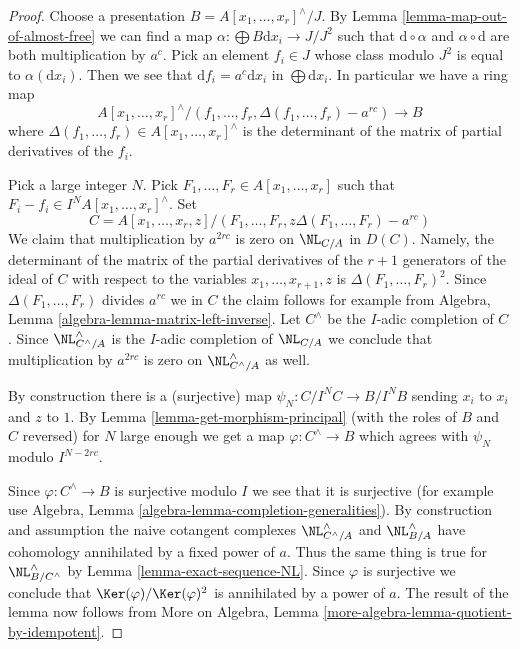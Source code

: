 \begin{proof}
Choose a presentation $B = A[x_1, \ldots, x_r]^\wedge/J$.
By Lemma \ref{lemma-map-out-of-almost-free} we can find a map
$\alpha : \bigoplus B\text{d}x_i \to J/J^2$ such that
$\text{d} \circ \alpha$ and $\alpha \circ \text{d}$ are both
multiplication by $a^c$. Pick an element $f_i \in J$ whose
class modulo $J^2$ is equal to $\alpha(\text{d}x_i)$.
Then we see that $\text{d}f_i = a^c \text{d}x_i$ in $\bigoplus \text{d}x_i$.
In particular we have a ring map
$$
A[x_1, \ldots, x_r]^\wedge/
(f_1, \ldots, f_r, \Delta(f_1, \ldots, f_r) - a^{rc})
\longrightarrow B
$$
where $\Delta(f_1, \ldots, f_r) \in A[x_1, \ldots, x_r]^\wedge$
is the determinant of the matrix of partial derivatives of the $f_i$.

\medskip\noindent
Pick a large integer $N$. Pick $F_1, \ldots, F_r \in A[x_1, \ldots, x_r]$
such that $F_i - f_i \in I^NA[x_1, \ldots, x_r]^\wedge$. Set
$$
C = A[x_1, \ldots, x_r, z]/
(F_1, \ldots, F_r, z\Delta(F_1, \ldots, F_r) - a^{rc})
$$
We claim that multiplication by $a^{2rc}$ is zero on $\NL_{C/A}$ in $D(C)$.
Namely, the determinant of the matrix of the partial derivatives
of the $r + 1$ generators of the ideal of $C$ with respect to the variables
$x_1, \ldots, x_{r + 1}, z$ is $\Delta(F_1, \ldots, F_r)^2$. Since
$\Delta(F_1, \ldots, F_r)$ divides $a^{rc}$ we in $C$ the
claim follows for example from
Algebra, Lemma \ref{algebra-lemma-matrix-left-inverse}.
Let $C^\wedge$ be the $I$-adic completion of $C$. Since
$\NL_{C^\wedge/A}^\wedge$ is the $I$-adic completion of $\NL_{C/A}$
we conclude that multiplication by $a^{2rc}$ is zero on
$\NL_{C^\wedge/A}^\wedge$ as well.

\medskip\noindent
By construction there is a (surjective) map $\psi_N : C/I^NC \to B/I^NB$
sending $x_i$ to $x_i$ and $z$ to $1$. By
Lemma \ref{lemma-get-morphism-principal} (with the roles of $B$ and $C$
reversed) for $N$ large enough we get a map $\varphi : C^\wedge \to B$ which
agrees with $\psi_N$ modulo $I^{N - 2rc}$.

\medskip\noindent
Since $\varphi : C^\wedge \to B$ is surjective modulo $I$ we see that it is
surjective (for example use
Algebra, Lemma \ref{algebra-lemma-completion-generalities}).
By construction and assumption the naive cotangent complexes
$\NL_{C^\wedge/A}^\wedge$ and $\NL_{B/A}^\wedge$
have cohomology annihilated by a fixed power of $a$. Thus the same thing
is true for $\NL_{B/C^\wedge}^\wedge$ by Lemma \ref{lemma-exact-sequence-NL}.
Since $\varphi$ is surjective we conclude that
$\Ker(\varphi)/\Ker(\varphi)^2$ is annihilated by a power of $a$.
The result of the lemma now follows from
More on Algebra, Lemma \ref{more-algebra-lemma-quotient-by-idempotent}.
\end{proof}









